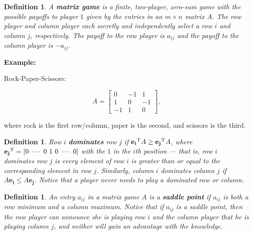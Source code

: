 \documentclass{article}
\theoremstyle{colontheorem}
\newtheorem{definition}[theorem]{Definition}
\newcommand{\T}{^\textnormal{T}}
\newenvironment{Def}
{
	\begin{mdframed}[backgroundcolor=DefGreen!10]
	\begin{definition}
}
{
	\end{definition}
	\end{mdframed}
	
	\vspace{.15in}
}
\newenvironment{Example}
{
	\begin{mdframed}
	\textbf{Example:}%
}
{
	\end{mdframed}
	
	\vspace{.15in}
}
\begin{document}
\begin{Def}
	
	A \textbf{matrix game} is a finite, two-player, zero-sum game with the possible payoffs to player $1$ given by the entries in an $m \times n$ matrix $A$. The row player and column player each secretly and independently select a row $i$ and column $j$, respectively. The payoff to the row player is $a_{ij}$ and the payoff to the column player is $-a_{ij}$.
	
\end{Def}



\begin{Example}
	Rock-Paper-Scissors:
	
	$$
	A = \begin{bmatrix}
	
	0 & -1 & 1\\
	1 & 0 & -1\\
	-1 & 1 & 0
	
	\end{bmatrix},
	$$
	
	where rock is the first row/column, paper is the second, and scissors is the third.
	
\end{Example}



\begin{Def}
	
	Row $i$ \textbf{dominates} row $j$ if $\mathbf{e_i}\T A \geq \mathbf{e_j}\T A$, where $\mathbf{e_j}\T = [0\ \cdots\ 0\ 1\ 0\ \cdots\ 0]$ with the $1$ in the $i$th position --- that is, row $i$ dominates row $j$ is every element of row $i$ is greater than or equal to the corresponding element in row $j$. Similarly, column $i$ dominates column $j$ if $A \mathbf{e_i} \leq A \mathbf{e_j}$. Notice that a player never needs to play a dominated row or column.
	
\end{Def}



\begin{Def}
	
	An entry $a_{ij}$ in a matrix game $A$ is a \textbf{saddle point} if $a_{ij}$ is both a row minimum and a column maximum. Notice that if $a_{ij}$ is a saddle point, then the row player can announce she is playing row $i$ and the column player that he is playing column $j$, and neither will gain an advantage with the knowledge.
	
\end{Def}
\end{document}
